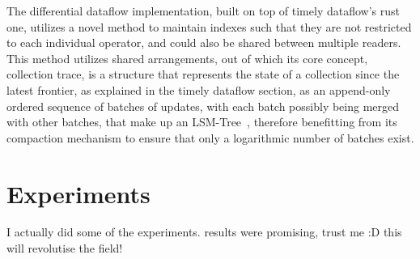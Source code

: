 \documentclass[manuscript,screen,review]{acmart}
\theoremstyle{definition}
\begin{document}
The differential dataflow implementation, built on top of timely dataflow's rust one, utilizes a novel method to maintain indexes such that they are not restricted
to each individual operator, and could also be shared between multiple readers. This method utilizes shared arrangements, out of which its core concept, collection
trace, is a structure that represents the state of a collection since the latest frontier, as explained in the timely dataflow section, as an append-only ordered sequence
of batches of updates, with each batch possibly being merged with other batches, that make up an LSM-Tree~\cite{lsm}, therefore benefitting from its compaction mechanism
to ensure that only a logarithmic number of batches exist.

\section{Experiments}

I actually did some of the experiments. results were promising, trust me :D this will revolutise the field!



\end{document}
